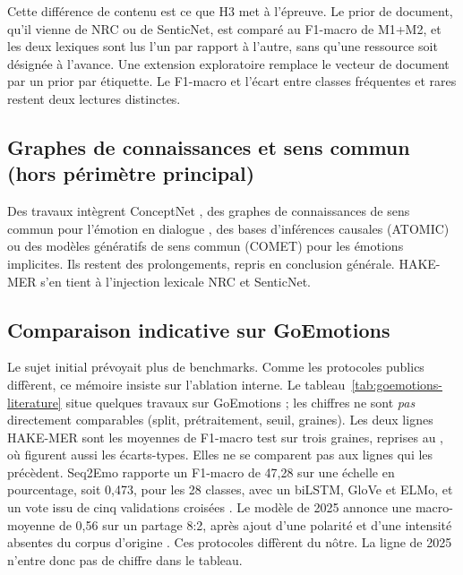 Cette différence de contenu est ce que H3 met à l'épreuve. Le prior de
document, qu'il vienne de NRC ou de SenticNet, est comparé au F1-macro
de M1+M2, et les deux lexiques sont lus l'un par rapport à l'autre,
sans qu'une ressource soit désignée à l'avance. Une extension
exploratoire remplace le vecteur de document par un prior par
étiquette. Le F1-macro et l'écart entre classes fréquentes et rares
restent deux lectures distinctes.

\subsection{Graphes de connaissances et sens commun (hors périmètre principal)}

Des travaux intègrent ConceptNet \cite{speer2017}, des graphes de
connaissances de sens commun pour l'émotion en dialogue
\cite{ghosal2020cosmic}, des bases d'inférences causales (ATOMIC) ou
des modèles génératifs de sens commun (COMET) pour les
émotions implicites. Ils restent des prolongements, repris en
conclusion générale. HAKE-MER s'en tient à l'injection lexicale NRC
et SenticNet.

\subsection{Comparaison indicative sur GoEmotions}
\label{sec:etat-art-comparaison}

Le sujet initial prévoyait plus de benchmarks. Comme les protocoles
publics diffèrent, ce mémoire insiste sur l'ablation interne. Le
tableau~\ref{tab:goemotions-literature} situe quelques travaux sur
GoEmotions ; les chiffres ne sont \emph{pas} directement comparables
(split, prétraitement, seuil, graines). Les deux lignes HAKE-MER sont
les moyennes de F1-macro test sur trois graines, reprises au
, où figurent aussi les écarts-types. Elles ne
se comparent pas aux lignes qui les précèdent. Seq2Emo rapporte un
F1-macro de 47{,}28 sur une échelle en pourcentage, soit 0{,}473, pour
les 28 classes, avec un biLSTM, GloVe et ELMo, et un vote issu de cinq
validations croisées \cite{ke2021seq2emo}. Le modèle de 2025 annonce une
macro-moyenne de 0{,}56 sur un partage 8:2, après ajout d'une polarité
et d'une intensité absentes du corpus d'origine
\cite{li2025emotion3dattn}. Ces protocoles diffèrent du nôtre. La ligne
de 2025 n'entre donc pas de chiffre dans le tableau.

